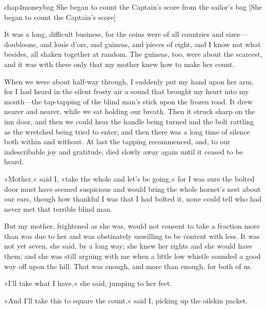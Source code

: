 
\begin{bwbigpic}
	[\picsize]
	{chap4moneybag}
	{She began to count the Captain's score from the sailor's bag}
	[She began to count the Captain's score]
\end{bwbigpic}

It was a long, difficult business, for the coins were of all countries and sizes—doubloons, and louis d'ors, and guineas, and pieces of eight, and I know not what besides, all shaken together at random. The guineas, too, were about the scarcest, and it was with these only that my mother knew how to make her count.

When we were about half-way through, I suddenly put my hand upon her arm, for I had heard in the silent frosty air a sound that brought my heart into my mouth—the tap-tapping of the blind man's stick upon the frozen road. It drew nearer and nearer, while we sat holding our breath. Then it struck sharp on the inn door, and then we could hear the handle being turned and the bolt rattling as the wretched being tried to enter; and then there was a long time of silence both within and without. At last the tapping recommenced, and, to our indescribable joy and gratitude, died slowly away again until it ceased to be heard.

»Mother,« said I, »take the whole and let's be going,« for I was sure the bolted door must have seemed suspicious and would bring the whole hornet's nest about our ears, though how thankful I was that I had bolted it, none could tell who had never met that terrible blind man.

But my mother, frightened as she was, would not consent to take a fraction more than was due to her and was obstinately unwilling to be content with less. It was not yet seven, she said, by a long way; she knew her rights and she would have them; and she was still arguing with me when a little low whistle sounded a good way off upon the hill. That was enough, and more than enough, for both of us.

»I'll take what I have,« she said, jumping to her feet.

»And I'll take this to square the count,« said I, picking up the oilskin packet.

